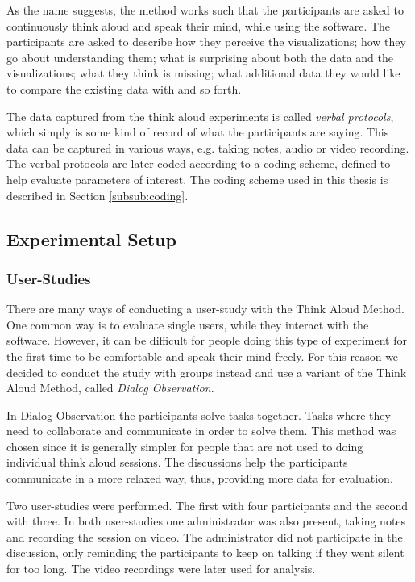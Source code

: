 \documentclass{acmtog} %
\begin{document}
As the name suggests, the method works such that the participants are asked to continuously think aloud and speak their mind, while using the software. The participants are asked to describe how they perceive the visualizations; how they go about understanding them; what is surprising about both the data and the visualizations; what they think is missing; what additional data they would like to compare the existing data with and so forth.

The data captured from the think aloud experiments is called \emph{verbal protocols}, which simply is some kind of record of what the participants are saying. This data can be captured in various ways, e.g. taking notes, audio or video recording. The verbal protocols are later coded according to a coding scheme, defined to help evaluate parameters of interest. The coding scheme used in this thesis is described in Section \ref{subsub:coding}.

\subsection{Experimental Setup}
\label{sub:exp}

\subsubsection{User-Studies}
\label{subsub:user_studies}
There are many ways of conducting a user-study with the Think Aloud Method. One common way is to evaluate single users, while they interact with the software. However, it can be difficult for people doing this type of experiment for the first time to be comfortable and speak their mind freely. For this reason we decided to conduct the study with groups instead and use a variant of the Think Aloud Method, called \emph{Dialog Observation}.

In Dialog Observation the participants solve tasks together. Tasks where they need to collaborate and communicate in order to solve them. This method was chosen since it is generally simpler for people that are not used to doing individual think aloud sessions. The discussions help the participants communicate in a more relaxed way, thus, providing more data for evaluation.

Two user-studies were performed. The first with four participants and the second with three. In both user-studies one administrator was also present, taking notes and recording the session on video. The administrator did not participate in the discussion, only reminding the participants to keep on talking if they went silent for too long. The video recordings were later used for analysis.
\end{document}
